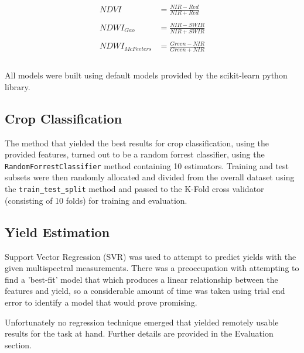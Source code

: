 \documentclass[conference]{IEEEtran}
\begin{document}
\begin{equation}
\begin{aligned}
NDVI &=  \frac{NIR - Red}{NIR + Red} \\ \\
NDWI_{Gao} &=  \frac{NIR - SWIR}{NIR + SWIR} \\ \\
NDWI_{McFeeters} &=  \frac{Green - NIR}{Green + NIR} \\ \\
\end{aligned}
\end{equation}

All models were built using default models provided by the scikit-learn python library.

\subsection{Crop Classification}
The method that yielded the best results for crop classification, using the provided features, turned out to be a random forrest classifier, using the \texttt{RandomForrestClassifier} method containing 10 estimators. Training and test subsets were then randomly allocated and divided from the overall dataset using the \texttt{train\_test\_split} method and passed to the K-Fold cross validator (consisting of 10 folds) for training and evaluation.

\subsection{Yield Estimation}
Support Vector Regression (SVR) was used to attempt to predict yields with the given multispectral measurements.  There was a preoccupation with attempting to find a 'best-fit' model that which produces a linear relationship between the features and yield, so a considerable amount of time was taken using trial end error to identify a model that would prove promising.

Unfortunately no regression technique emerged that yielded remotely usable results for the task at hand.  Further details are provided in the Evaluation section.
\end{document}
